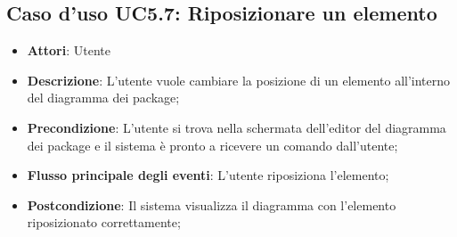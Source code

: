 \documentclass[../AnalisiDeiRequisiti.tex]{subfiles}
\begin{document}
			\subsection{Caso d'uso UC5.7: Riposizionare un elemento}
			\begin{itemize}
				\item \textbf{Attori}: Utente
				\item \textbf{Descrizione}: L'utente vuole cambiare la posizione di un elemento all'interno del diagramma dei package;
				\item \textbf{Precondizione}: L'utente si trova nella schermata dell'editor del diagramma dei package e il sistema è pronto a ricevere un comando dall'utente;
				\item \textbf{Flusso principale degli eventi}: L'utente riposiziona l'elemento;
				\item \textbf{Postcondizione}: Il sistema visualizza il diagramma con l'elemento riposizionato correttamente;
			\end{itemize}
\end{document}
